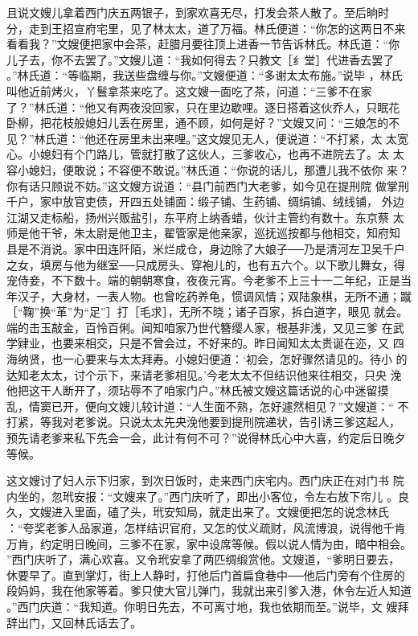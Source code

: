 且说文嫂儿拿着西门庆五两银子，到家欢喜无尽，打发会茶人散了。至后晌时
分，走到王招宣府宅里，见了林太太，道了万福。林氏便道：“你怎的这两日不来
看看我？”文嫂便把家中会茶，赶腊月要往顶上进香一节告诉林氏。林氏道：“你
儿子去，你不去罢了。”文嫂儿道：“我如何得去？只教文［纟堂］代进香去罢了
。”林氏道：“等临期，我送些盘缠与你。”文嫂便道：“多谢太太布施。”说毕
，林氏叫他近前烤火，丫鬟拿茶来吃了。这文嫂一面吃了茶，问道：“三爹不在家
了？”林氏道：“他又有两夜没回家，只在里边歇哩。逐日搭着这伙乔人，只眠花
卧柳，把花枝般媳妇儿丢在房里，通不顾，如何是好？”文嫂又问：“三娘怎的不
见？”林氏道：“他还在房里未出来哩。”这文嫂见无人，便说道：“不打紧，太
太宽心。小媳妇有个门路儿，管就打散了这伙人，三爹收心，也再不进院去了。太
太容小媳妇，便敢说；不容便不敢说。”林氏道：“你说的话儿，那遭儿我不依你
来？你有话只顾说不妨。”这文嫂方说道：“县门前西门大老爹，如今见在提刑院
做掌刑千户，家中放官吏债，开四五处铺面：缎子铺、生药铺、绸绢铺、绒线铺，
外边江湖又走标船，扬州兴贩盐引，东平府上纳香蜡，伙计主管约有数十。东京蔡
太师是他干爷，朱太尉是他卫主，翟管家是他亲家，巡抚巡按都与他相交，知府知
县是不消说。家中田连阡陌，米烂成仓，身边除了大娘子──乃是清河左卫吴千户
之女，填房与他为继室──只成房头、穿袍儿的，也有五六个。以下歌儿舞女，得
宠侍妾，不下数十。端的朝朝寒食，夜夜元宵。今老爹不上三十一二年纪，正是当
年汉子，大身材，一表人物。也曾吃药养龟，惯调风情；双陆象棋，无所不通；蹴
［“鞠”换“革”为“足”］打［毛求］，无所不晓；诸子百家，拆白道字，眼见
就会。端的击玉敲金，百怜百俐。闻知咱家乃世代簪缨人家，根基非浅，又见三爹
在武学肄业，也要来相交，只是不曾会过，不好来的。昨日闻知太太贵诞在迩，又
四海纳贤，也一心要来与太太拜寿。小媳妇便道：‘初会，怎好骤然请见的。待小
的达知老太太，讨个示下，来请老爹相见。’今老太太不但结识他来往相交，只央
浼他把这干人断开了，须玷辱不了咱家门户。”林氏被文嫂这篇话说的心中迷留摸
乱，情窦已开，便向文嫂儿较计道：“人生面不熟，怎好遽然相见？”文嫂道：“
不打紧，等我对老爹说。只说太太先央浼他要到提刑院递状，告引诱三爹这起人，
预先请老爹来私下先会一会，此计有何不可？”说得林氏心中大喜，约定后日晚夕
等候。

这文嫂讨了妇人示下归家，到次日饭时，走来西门庆宅内。西门庆正在对门书
院内坐的，忽玳安报：“文嫂来了。”西门庆听了，即出小客位，令左右放下帘儿
。良久，文嫂进入里面，磕了头，玳安知局，就走出来了。文嫂便把怎的说念林氏
：“夸奖老爹人品家道，怎样结识官府，又怎的仗义疏财，风流博浪，说得他千肯
万肯，约定明日晚间，三爹不在家，家中设席等候。假以说人情为由，暗中相会。
”西门庆听了，满心欢喜。又令玳安拿了两匹绸缎赏他。文嫂道，“爹明日要去，
休要早了。直到掌灯，街上人静时，打他后门首扁食巷中──他后门旁有个住房的
段妈妈，我在他家等着。爹只使大官儿弹门，我就出来引爹入港，休令左近人知道
。”西门庆道：“我知道。你明日先去，不可离寸地，我也依期而至。”说毕，文
嫂拜辞出门，又回林氏话去了。

